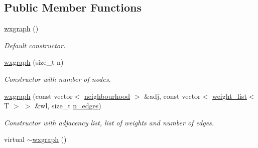 \subsection*{Public Member Functions}
\begin{DoxyCompactItemize}
\item 
\hypertarget{classlgraph_1_1utils_1_1wxgraph_aaf4bc23e2bc74fd2a28aff2f56c6dbb2}{\hyperlink{classlgraph_1_1utils_1_1wxgraph_aaf4bc23e2bc74fd2a28aff2f56c6dbb2}{wxgraph} ()}\label{classlgraph_1_1utils_1_1wxgraph_aaf4bc23e2bc74fd2a28aff2f56c6dbb2}

\begin{DoxyCompactList}\small\item\em Default constructor. \end{DoxyCompactList}\item 
\hypertarget{classlgraph_1_1utils_1_1wxgraph_aab16730e9f2f1aa32cfe9efcba332913}{\hyperlink{classlgraph_1_1utils_1_1wxgraph_aab16730e9f2f1aa32cfe9efcba332913}{wxgraph} (size\-\_\-t n)}\label{classlgraph_1_1utils_1_1wxgraph_aab16730e9f2f1aa32cfe9efcba332913}

\begin{DoxyCompactList}\small\item\em Constructor with number of nodes. \end{DoxyCompactList}\item 
\hyperlink{classlgraph_1_1utils_1_1wxgraph_abe83452edd9cb1a0a65d9d247120e6f5}{wxgraph} (const vector$<$ \hyperlink{namespacelgraph_1_1utils_a0f2ef47028a466d26841709e705390ac}{neighbourhood} $>$ \&adj, const vector$<$ \hyperlink{namespacelgraph_1_1utils_a11e7963f3637ea13778b8d3e69d2c17f}{weight\-\_\-list}$<$ T $>$ $>$ \&wl, size\-\_\-t \hyperlink{classlgraph_1_1utils_1_1xxgraph_af3f7c3835406c2cbf70479ae1c0253c9}{n\-\_\-edges})
\begin{DoxyCompactList}\small\item\em Constructor with adjacency list, list of weights and number of edges. \end{DoxyCompactList}\item 
\hypertarget{classlgraph_1_1utils_1_1wxgraph_a970197826a0b64152fd812929b9038f1}{virtual \hyperlink{classlgraph_1_1utils_1_1wxgraph_a970197826a0b64152fd812929b9038f1}{$\sim$wxgraph} ()}\label{classlgraph_1_1utils_1_1wxgraph_a970197826a0b64152fd812929b9038f1}


\end{DoxyCompactItemize}
